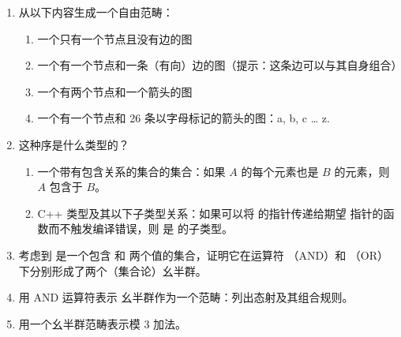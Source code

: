 \begin{enumerate}
  \tightlist
  \item
  从以下内容生成一个自由范畴：

  \begin{enumerate}
    \tightlist
    \item
    一个只有一个节点且没有边的图
    \item
    一个有一个节点和一条（有向）边的图（提示：这条边可以与其自身组合）
    \item
    一个有两个节点和一个箭头的图
    \item
    一个有一个节点和 26 条以字母标记的箭头的图：a, b, c \ldots{} z.
  \end{enumerate}
  \item
  这种序是什么类型的？

  \begin{enumerate}
    \tightlist
    \item
    一个带有包含关系的集合的集合：如果 $A$ 的每个元素也是 $B$ 的元素，则 $A$ 包含于 $B$。
    \item
    C++ 类型及其以下子类型关系：如果可以将  的指针传递给期望  指针的函数而不触发编译错误，则  是  的子类型。
  \end{enumerate}
  \item
  考虑到  是一个包含  和  两个值的集合，证明它在运算符 \code{\&\&}（AND）和 \code{||}（OR）下分别形成了两个（集合论）幺半群。
  \item
  用 AND 运算符表示  幺半群作为一个范畴：列出态射及其组合规则。
  \item
  用一个幺半群范畴表示模 3 加法。
\end{enumerate}
